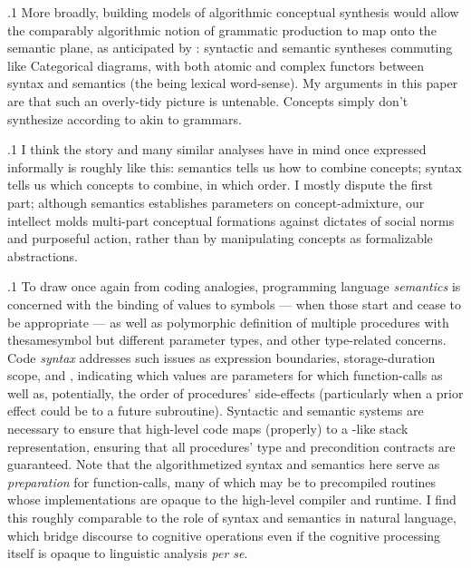 \documentclass[11pt, twocolumn]{article}
\begin{document}
\p.1{%
\:\+More broadly, building
models of algorithmic conceptual synthesis would allow the comparably
algorithmic notion of grammatic production to map onto the semantic
plane, as anticipated by \Boltetal{}: syntactic and semantic syntheses
commuting like Categorical diagrams, with both atomic and complex functors
between syntax and semantics (the  being lexical word-sense). \> 
My arguments in this paper are that such an overly-tidy picture is
untenable. \>  Concepts simply don't synthesize according to
 akin to  grammars.\<\;
}%

\p.1{%
\:\+I think the story \Boltetal{} and many similar analyses have
in mind \mdash{} once expressed informally \mdash{} is roughly like this:
semantics tells us how to combine concepts;
syntax tells us which concepts to combine, in which
order. \>  I mostly dispute the first part; although
semantics establishes parameters on concept-admixture,
our intellect molds multi-part
conceptual formations against dictates
of social norms and purposeful action, rather than
by manipulating concepts as formalizable abstractions.\<\;
}%

\p.1{%
\:\+To draw once again from coding analogies,
programming language \textit{semantics} is concerned with the binding
of values to symbols --- when those  start and
cease to be appropriate --- as well as polymorphic
definition of multiple procedures with thesamesymbol
but different parameter types, and other type-related
concerns. \>  Code \textit{syntax} addresses such issues as
expression boundaries, storage-duration scope, and , indicating
which values are parameters for which function-calls as
well as, potentially, the order of procedures' side-effects
(particularly when a prior effect could be  to
a future subroutine). \>  Syntactic and
semantic systems are necessary to ensure that high-level code
maps (properly) to a -like stack representation, ensuring that
all procedures' type and precondition contracts are guaranteed. \> 
Note that the algorithmetized syntax and semantics here
serve as \textit{preparation} for function-calls, many of which
may be to precompiled routines whose implementations are
opaque to the high-level compiler and runtime. \>  I find this
roughly comparable to the role of syntax and semantics
in natural language, which bridge discourse to cognitive
operations even if the cognitive processing itself
is opaque to linguistic analysis \textit{per se}.\<\;
}%
\end{document}
